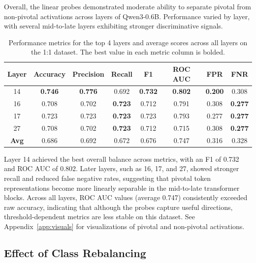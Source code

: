 \documentclass{article}
\begin{document}
Overall, the linear probes demonstrated moderate ability to separate pivotal from non-pivotal activations across layers of Qwen3-0.6B. Performance varied by layer, with several mid-to-late layers exhibiting stronger discriminative signals.

\begin{table}[h]
\centering
\setlength{\tabcolsep}{6pt} %
\renewcommand{\arraystretch}{1.2} %
\begin{tabular}{c c c c c c c c}
\toprule
\textbf{Layer} & \textbf{Accuracy} & \textbf{Precision} & \textbf{Recall} & \textbf{F1} & \textbf{ROC AUC} & \textbf{FPR} & \textbf{FNR} \\
\midrule
14 & \textbf{0.746} & \textbf{0.776} & 0.692 & \textbf{0.732} & \textbf{0.802} & \textbf{0.200} & 0.308 \\
16 & 0.708 & 0.702 & \textbf{0.723} & 0.712 & 0.791 & 0.308 & \textbf{0.277} \\
17 & 0.723 & 0.723 & \textbf{0.723} & 0.723 & 0.793 & 0.277 & \textbf{0.277} \\
27 & 0.708 & 0.702 & \textbf{0.723} & 0.712 & 0.715 & 0.308 & \textbf{0.277} \\
\midrule
\textbf{Avg} & 0.686 & 0.692 & 0.672 & 0.676 & 0.747 & 0.316 & 0.328 \\
\bottomrule
\end{tabular}
\vspace{1em}
\caption{Performance metrics for the top 4 layers and average scores across all layers on the 1:1 dataset. The best value in each metric column is bolded.}
\label{tab:layer-performance-1to1}
\end{table}
Layer 14 achieved the best overall balance across metrics, with an F1 of 0.732 and ROC AUC of 0.802. Later layers, such as 16, 17, and 27, showed stronger recall and reduced false negative rates, suggesting that pivotal token representations become more linearly separable in the mid-to-late transformer blocks. Across all layers, ROC AUC values (average 0.747) consistently exceeded raw accuracy, indicating that although the probes capture useful directions, threshold-dependent metrics are less stable on this dataset. See Appendix~\ref{app:visuals} for visualizations of pivotal and non-pivotal activations.


\subsection{Effect of Class Rebalancing}
\end{document}
